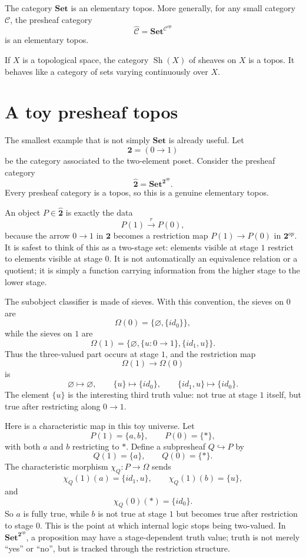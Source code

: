 \begin{example}
The category \(\mathbf{Set}\) is an elementary topos.  More generally, for any small category \(\mathcal C\), the presheaf category
\[
  \widehat{\mathcal C}=\mathbf{Set}^{\mathcal C^{op}}
\]
is an elementary topos.
\end{example}

\begin{example}
If \(X\) is a topological space, the category \(\operatorname{Sh}(X)\) of sheaves on \(X\) is a topos.  It behaves like a category of sets varying continuously over \(X\).
\end{example}

\section{A toy presheaf topos}

The smallest example that is not simply \(\mathbf{Set}\) is already useful.  Let
\[
  \mathbf 2=(0\to1)
\]
be the category associated to the two-element poset.  Consider the presheaf category
\[
  \widehat{\mathbf 2}
  =
  \mathbf{Set}^{\mathbf 2^{op}}.
\]
Every presheaf category is a topos, so this is a genuine elementary topos.

An object \(P\in\widehat{\mathbf 2}\) is exactly the data
\[
  P(1)\xrightarrow{\,r\,}P(0),
\]
because the arrow \(0\to1\) in \(\mathbf2\) becomes a restriction map \(P(1)\to P(0)\) in \(\mathbf2^{op}\).  It is safest to think of this as a two-stage set: elements visible at stage \(1\) restrict to elements visible at stage \(0\).  It is not automatically an equivalence relation or a quotient; it is simply a function carrying information from the higher stage to the lower stage.

The subobject classifier is made of sieves.  With this convention, the sieves on \(0\) are
\[
  \Omega(0)=\{\varnothing,\{id_0\}\},
\]
while the sieves on \(1\) are
\[
  \Omega(1)=\{\varnothing,\{u:0\to1\},\{id_1,u\}\}.
\]
Thus the three-valued part occurs at stage \(1\), and the restriction map
\[
  \Omega(1)\longrightarrow\Omega(0)
\]
is
\[
  \varnothing\mapsto\varnothing,
  \qquad
  \{u\}\mapsto\{id_0\},
  \qquad
  \{id_1,u\}\mapsto\{id_0\}.
\]
The element \(\{u\}\) is the interesting third truth value: not true at stage \(1\) itself, but true after restricting along \(0\to1\).

Here is a characteristic map in this toy universe.  Let
\[
  P(1)=\{a,b\},\qquad P(0)=\{*\},
\]
with both \(a\) and \(b\) restricting to \(*\).  Define a subpresheaf \(Q\hookrightarrow P\) by
\[
  Q(1)=\{a\},\qquad Q(0)=\{*\}.
\]
The characteristic morphism \(\chi_Q:P\to\Omega\) sends
\[
  \chi_Q(1)(a)=\{id_1,u\},
  \qquad
  \chi_Q(1)(b)=\{u\},
\]
and
\[
  \chi_Q(0)(*)=\{id_0\}.
\]
So \(a\) is fully true, while \(b\) is not true at stage \(1\) but becomes true after restriction to stage \(0\).  This is the point at which internal logic stops being two-valued.  In \(\mathbf{Set}^{\mathbf2^{op}}\), a proposition may have a stage-dependent truth value; truth is not merely ``yes'' or ``no'', but is tracked through the restriction structure.


